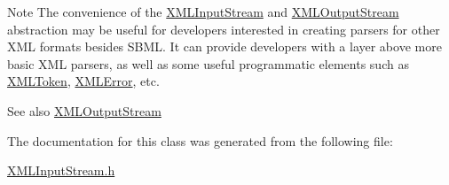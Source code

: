 \begin{DoxyNote}{Note}
The convenience of the \hyperlink{class_x_m_l_input_stream}{X\+M\+L\+Input\+Stream} and \hyperlink{class_x_m_l_output_stream}{X\+M\+L\+Output\+Stream} abstraction may be useful for developers interested in creating parsers for other X\+ML formats besides S\+B\+ML. It can provide developers with a layer above more basic X\+ML parsers, as well as some useful programmatic elements such as \hyperlink{class_x_m_l_token}{X\+M\+L\+Token}, \hyperlink{class_x_m_l_error}{X\+M\+L\+Error}, etc.
\end{DoxyNote}
\begin{DoxySeeAlso}{See also}
\hyperlink{class_x_m_l_output_stream}{X\+M\+L\+Output\+Stream} 
\end{DoxySeeAlso}


The documentation for this class was generated from the following file\+:\begin{DoxyCompactItemize}
\item 
\hyperlink{_x_m_l_input_stream_8h}{X\+M\+L\+Input\+Stream.\+h}\end{DoxyCompactItemize}
